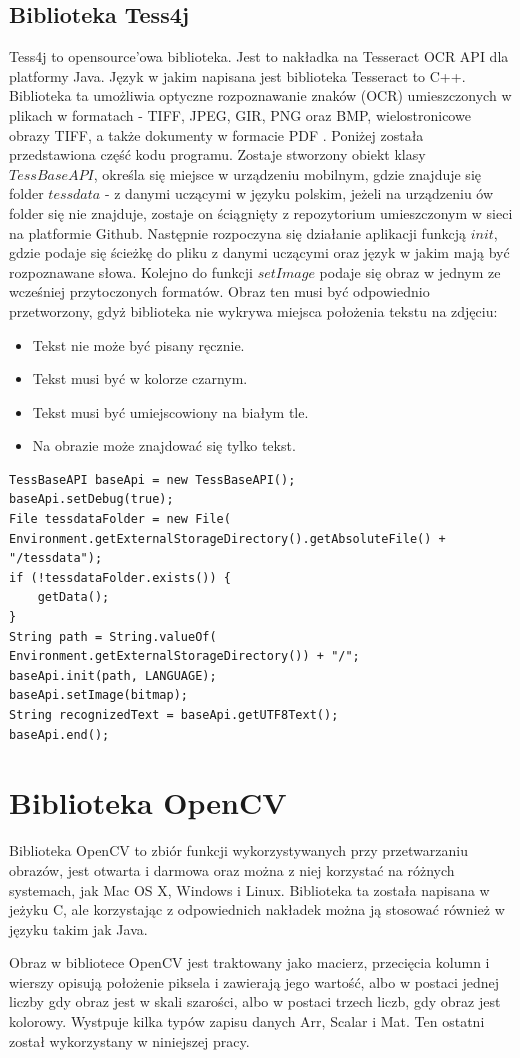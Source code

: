 \documentclass[eng,oneside]{mgr}
\begin{document}
\subsection{Biblioteka Tess4j}
Tess4j to opensource'owa biblioteka. Jest to nakładka na Tesseract OCR API dla platformy Java. Język w jakim napisana jest biblioteka Tesseract to C++. Biblioteka ta umożliwia optyczne rozpoznawanie znaków (OCR) umieszczonych w plikach w formatach - TIFF, JPEG, GIR, PNG oraz BMP, wielostronicowe obrazy TIFF, a także dokumenty w formacie PDF \cite{tess4j}.
Poniżej została przedstawiona część kodu programu. Zostaje stworzony obiekt klasy $TessBaseAPI$, określa się miejsce w urządzeniu mobilnym, gdzie znajduje się folder $tessdata$ - z danymi uczącymi w języku polskim, jeżeli na urządzeniu ów folder się nie znajduje, zostaje on ściągnięty z repozytorium umieszczonym w sieci na platformie Github. Następnie rozpoczyna się działanie aplikacji funkcją $init$, gdzie podaje się ścieżkę do pliku z danymi uczącymi oraz język w jakim mają być rozpoznawane słowa. Kolejno do funkcji $setImage$ podaje się obraz w jednym ze wcześniej przytoczonych formatów. Obraz ten musi być odpowiednio przetworzony, gdyż biblioteka nie wykrywa miejsca położenia tekstu na zdjęciu:
\begin{itemize}
\item Tekst nie może być pisany ręcznie.
\item Tekst musi być w kolorze czarnym.
\item Tekst musi być umiejscowiony na białym tle.
\item Na obrazie może znajdować się tylko tekst.
\end{itemize}

\begin{lstlisting}[caption={Kod programu, odpowiadający za odwołanie  do zewnętrznego API Tess4j}]
TessBaseAPI baseApi = new TessBaseAPI();
baseApi.setDebug(true);
File tessdataFolder = new File(
Environment.getExternalStorageDirectory().getAbsoluteFile() + "/tessdata");
if (!tessdataFolder.exists()) {
    getData();
}
String path = String.valueOf(
Environment.getExternalStorageDirectory()) + "/";
baseApi.init(path, LANGUAGE);
baseApi.setImage(bitmap);
String recognizedText = baseApi.getUTF8Text();
baseApi.end();
\end{lstlisting}
\section{Biblioteka OpenCV}
Biblioteka OpenCV to zbiór funkcji wykorzystywanych przy przetwarzaniu obrazów, jest otwarta i darmowa oraz można z niej korzystać na różnych systemach, jak Mac OS X, Windows i Linux. Biblioteka ta została napisana w jeżyku C, ale korzystając z odpowiednich nakładek można ją stosować również w języku takim jak Java.
\par Obraz w bibliotece OpenCV jest traktowany jako macierz, przecięcia kolumn i wierszy opisują położenie piksela i zawierają jego wartość, albo w postaci jednej liczby gdy obraz jest w skali szarości, albo w postaci trzech liczb, gdy obraz jest kolorowy. Wystpuje kilka typów zapisu danych Arr, Scalar i Mat. Ten ostatni został wykorzystany w niniejszej pracy\cite{opencv}.
\end{document}
